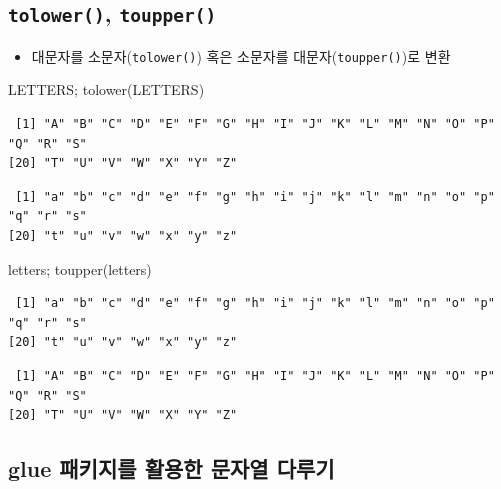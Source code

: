 \documentclass[
  11pt,
]{krantz}
\newenvironment{Shaded}{\begin{snugshade}}{\end{snugshade}}
\newcommand{\FunctionTok}[1]{\textcolor[rgb]{0,0,0}{#1}}
\newcommand{\NormalTok}[1]{#1}
\providecommand{\tightlist}{%
  \setlength{\itemsep}{0pt}\setlength{\parskip}{0pt}}
\begin{document}
\normalsize

\hypertarget{low-up-fun}{%
\subsection{\texorpdfstring{\textbf{\texttt{tolower()}, \texttt{toupper()}}}{tolower(), toupper()}}\label{low-up-fun}}

\begin{itemize}
\tightlist
\item
  대문자를 소문자(\texttt{tolower()}) 혹은 소문자를 대문자(\texttt{toupper()})로 변환
\end{itemize}

\footnotesize

\begin{Shaded}
\begin{Highlighting}[]
\NormalTok{LETTERS; }\FunctionTok{tolower}\NormalTok{(LETTERS)}
\end{Highlighting}
\end{Shaded}

\begin{verbatim}
 [1] "A" "B" "C" "D" "E" "F" "G" "H" "I" "J" "K" "L" "M" "N" "O" "P" "Q" "R" "S"
[20] "T" "U" "V" "W" "X" "Y" "Z"
\end{verbatim}

\begin{verbatim}
 [1] "a" "b" "c" "d" "e" "f" "g" "h" "i" "j" "k" "l" "m" "n" "o" "p" "q" "r" "s"
[20] "t" "u" "v" "w" "x" "y" "z"
\end{verbatim}

\begin{Shaded}
\begin{Highlighting}[]
\NormalTok{letters; }\FunctionTok{toupper}\NormalTok{(letters)}
\end{Highlighting}
\end{Shaded}

\begin{verbatim}
 [1] "a" "b" "c" "d" "e" "f" "g" "h" "i" "j" "k" "l" "m" "n" "o" "p" "q" "r" "s"
[20] "t" "u" "v" "w" "x" "y" "z"
\end{verbatim}

\begin{verbatim}
 [1] "A" "B" "C" "D" "E" "F" "G" "H" "I" "J" "K" "L" "M" "N" "O" "P" "Q" "R" "S"
[20] "T" "U" "V" "W" "X" "Y" "Z"
\end{verbatim}

\normalsize

\hypertarget{glue-uxd328uxd0a4uxc9c0uxb97c-uxd65cuxc6a9uxd55c-uxbb38uxc790uxc5f4-uxb2e4uxb8e8uxae30}{%
\subsection{glue 패키지를 활용한 문자열 다루기}\label{glue-uxd328uxd0a4uxc9c0uxb97c-uxd65cuxc6a9uxd55c-uxbb38uxc790uxc5f4-uxb2e4uxb8e8uxae30}}
\end{document}
